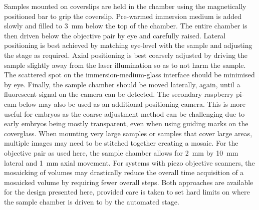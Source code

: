 Samples mounted on coverslips are held in the chamber using the magnetically positioned bar to grip the coverslip.
Pre-warmed immersion medium is added slowly and filled to \SI{3}{\milli\meter} below the top of the chamber.
The entire chamber is then driven below the objective pair by eye and carefully raised.
Lateral positioning is best achieved by matching eye-level with the sample and adjusting the stage as required.
Axial positioning is best coarsely adjusted by driving the sample slightly away from the laser illumination so as to not harm the sample.
The scattered spot on the immersion-medium-glass interface should be minimised by eye.
Finally, the sample chamber should be moved laterally, again, until a fluorescent signal on the camera can be detected.
The secondary raspberry pi-cam below may also be used as an additional positioning camera.
This is more useful for embryos as the coarse adjustment method can be challenging due to early embryos being mostly transparent, even when using guiding marks on the coverglass.
When mounting very large samples or samples that cover large areas, multiple images may need to be stitched together creating a mosaic.
For the objective pair as used here, the sample chamber allows for \SI{2}{\milli\metre} by \SI{10}{\milli\metre} lateral and \SI{1}{\milli\metre} axial movement.
For systems with piezo objective scanners, the mosaicking of volumes may drastically reduce the overall time acquisition of a mosaicked volume by requiring fewer overall steps.
Both approaches are available for the design presented here, provided care is taken to set hard limits on where the sample chamber is driven to by the automated stage.



